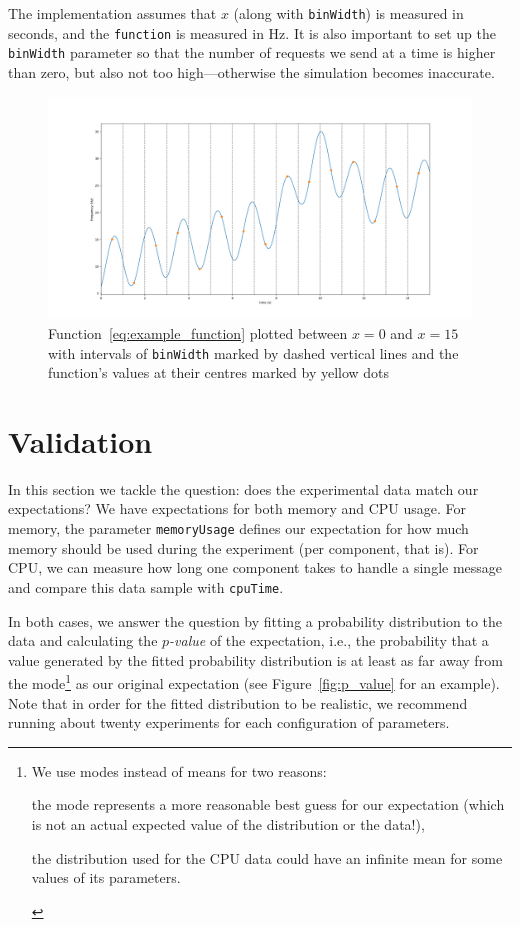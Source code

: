 \documentclass{article}
\begin{document}
The implementation assumes that $x$ (along with \texttt{binWidth}) is measured
in seconds, and the \texttt{function} is measured in \si{\hertz}. It is also
important to set up the \texttt{binWidth} parameter so that the number of
requests we send at a time is higher than zero, but also not too
high---otherwise the simulation becomes inaccurate.

\begin{figure}
  \centering
  \includegraphics[width=\textwidth]{../plots/functional_workload.png}
  \caption{Function~\eqref{eq:example_function} plotted between $x=0$ and
    $x=15$ with intervals of \texttt{binWidth} marked by dashed vertical lines
    and the function's values at their centres marked by yellow dots}
  \label{fig:functional_workload}
\end{figure}

\section{Validation}

In this section we tackle the question: does the experimental data match our
expectations? We have expectations for both memory and CPU usage. For memory,
the parameter \texttt{memoryUsage} defines our expectation for how much memory
should be used during the experiment (per component, that is). For CPU, we can
measure how long one component takes to handle a single message and compare this
data sample with \texttt{cpuTime}.

In both cases, we answer the question by fitting a probability distribution to
the data and calculating the \emph{$p$-value} of the expectation, i.e., the
probability that a value generated by the fitted probability distribution is at
least as far away from the mode\footnote{We use modes instead of means for two
  reasons:
  \begin{itemize*}
  \item the mode represents a more reasonable best guess for our expectation
    (which is not an actual expected value of the distribution or the data!),
  \item the distribution used for the CPU data could have an infinite mean for
    some values of its parameters.
  \end{itemize*}} as our original expectation (see Figure~\ref{fig:p_value} for
an example). Note that in order for the fitted distribution to be realistic, we
recommend running about twenty experiments for each configuration of parameters.
\end{document}
